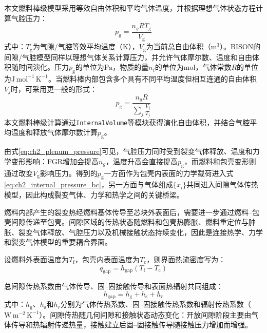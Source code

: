 本文燃料棒级模型采用等效自由体积和平均气体温度，并根据理想气体状态方程计算气腔压力：
\begin{equation}
	p_{\mathrm g}
	=\frac{n_gRT_{\mathrm g}}{V_{\mathrm g}}
	\label{eq:ch2_plenum_pressure}
\end{equation}
\noindent 式中：$T_{\mathrm g}$为气隙/气腔等效平均温度（$\mathrm{K}$），$V_{\mathrm g}$为当前总自由体积（$\mathrm{m^3}$）。BISON的间隙/气腔模型同样以理想气体关系计算压力，并允许气体摩尔数、温度和自由体积随时间演化\cite{halesBISONTheoryManual2016}。压力$p_{\mathrm g}$的单位为$\mathrm{Pa}$，物质的量$n_i$的单位为$\mathrm{mol}$，气体常数$R$的单位为$\mathrm{J\,mol^{-1}\,K^{-1}}$。当燃料棒内部包含多个具有不同平均温度但相互连通的自由体积$V_j$时，可采用更一般的形式：
\begin{equation}
	p_{\mathrm g}
	=\frac{n_gR}
	{\displaystyle\sum_j\frac{V_j}{T_j}}
	\label{eq:ch2_plenum_pressure_multivolume}
\end{equation}
本文燃料棒级计算通过\texttt{InternalVolume}等模块获得演化自由体积，并结合气腔平均温度和释放气体摩尔数计算$p_{\mathrm g}$。

由式\eqref{eq:ch2_plenum_pressure}可见，气腔压力同时受到裂变气体释放、温度和力学变形影响：FGR增加会提高$n_g$，温度升高会直接提高$p_{\mathrm g}$，而燃料和包壳变形则通过改变$V_{\mathrm g}$影响压力。得到的$p_{\mathrm g}$一方面作为包壳内表面的力学载荷进入式\eqref{eq:ch2_internal_pressure_bc}，另一方面与气体组成$\{x_i\}$共同进入间隙气体传热模型，因此构成裂变气体、力学和热学之间的关键桥梁。

\label{sec:ch2_gap_heat_transfer}

燃料内部产生的裂变热经燃料基体传导至芯块外表面后，需要进一步通过燃料--包壳间隙传递至包壳。间隙区域的传热状态随燃料和包壳热膨胀、燃料重定位与肿胀、裂变气体释放、气腔压力以及机械接触状态持续变化，因此是连接热学、力学和裂变气体模型的重要耦合界面\cite{hagrmanSCDAPRELAP5MOD1995,luscherMaterialPropertyCorrelations2010,halesBISONTheoryManual2016}。


设燃料外表面温度为$T_{\mathrm f}$，包壳内表面温度为$T_{\mathrm c}$，则界面热流密度写为：
\begin{equation}
	q_{\mathrm{gap}}
	=h_{\mathrm{gap}}
	\left(T_{\mathrm f}-T_{\mathrm c}\right)
	\label{eq:ch2_gap_heat_flux}
\end{equation}

总间隙传热系数由气体传导、固--固接触传导和表面热辐射共同组成：
\begin{equation}
	h_{\mathrm{gap}}
	=h_{\mathrm g}+h_{\mathrm s}+h_r
	\label{eq:ch2_total_gap_conductance}
\end{equation}
\noindent 式中：$h_{\mathrm g}$、$h_{\mathrm s}$和$h_r$分别为气体传热系数、固--固接触传热系数和辐射传热系数（$\mathrm{W\,m^{-2}\,K^{-1}}$）。间隙传热随几何间隙和接触状态动态变化：开放间隙阶段主要由气体传导和热辐射传递热量，接触建立后固--固接触传导随接触压力增加而增强。

